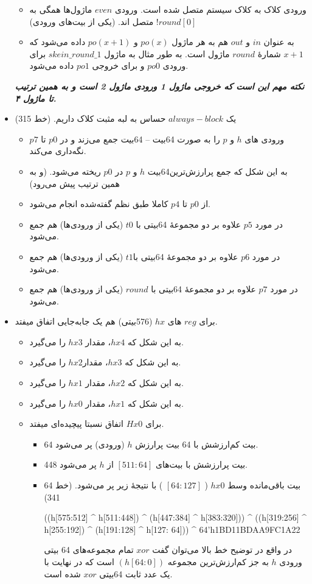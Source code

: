 \begin{itemize}
 \begin{itemize}
 \item ورودی کلاک به کلاک سیستم متصل شده است.
ورودی $ even$ ماژول‌ها همگی به  $!round[0]$ متصل اند. (یکی از بیت‌های ورودی)
\item
به عنوان $in$ و $ out $ هم به هر ماژول $po(x)$ و $po(x+1)$ داده می‌شود که $x+1$ شمارهٔ $ round$ ماژول است. به طور مثال به ماژول $skein\_round\_1$ برای ورودی $po0$ و برای خروجی $po1$ داده می‌شود.
 \end{itemize}
\textit{\textbf{ نکته مهم این است که خروجی ماژول 1 ورودی ماژول 2 است و به همین ترتیب تا ماژول ۴.
}}
\item
یک $always-block$ حساس به لبه مثبت کلاک داریم. (خط 315)
\begin{itemize}
\item
ورودی های $h $ و $p $ را به صورت 64بیت – 64بیت جمع می‌زند و در $p0$ تا $p7$ نگه‌داری می‌کند.
\item
به این شکل که جمع پرارزش‌ترین64بیت $h$ و $p$ در $p0$ ریخته می‌شود. (و به همین ترتیب پیش می‌رود)
\item
از $p0$ تا $p4$ کاملا طبق نظم گفته‌شده انجام می‌شود.
\item
در مورد $p5$ علاوه بر دو مجموعهٔ 64بیتی با $t0$ (یکی از ورودی‌ها) هم جمع می‌شود.
\item
در مورد $ p6$ علاوه بر دو مجموعهٔ 64بیتی با$ t1$ (یکی از ورودی‌ها) هم جمع می‌شود.
\item
در مورد $ p7 $ علاوه بر دو مجموعهٔ 64بیتی با $round$ (یکی از ورودی‌ها) هم جمع می‌شود.
\end{itemize}
\item
برای $reg$ های $hx$ (576بیتی) هم یک جابه‌جایی اتفاق میفتد.
\begin{itemize}
\item
به این شکل که $hx4$، مقدار $hx3$ را می‌گیرد.
\item
به این شکل که $hx3$، مقدار$ hx2$ را می‌گیرد.
\item
به این شکل که $hx2$، مقدار $hx1$ را می‌گیرد.
\item
به این شکل که $hx1$، مقدار $hx0$ را می‌گیرد.
\item
برای $Hx0$ اتفاق نسبتا پیچیده‌ای میفتد.
\begin{itemize}
\item
64 بیت کم‌ارزشش با 64 بیت پرارزش $h$ (ورودی) پر می‌شود.
\item
448 بیت پرارزشش  با بیت‌های $[511:64]$ از $h$ پر می‌شود.
\item
64 بیت باقی‌مانده وسط $hx0$ ( $[64:127]$ ) با نتیجهٔ زیر پر می‌شود.  (خط 341)
\begin{code}
((h[575:512] ^ h[511:448]) ^ (h[447:384] ^ h[383:320])) ^ ((h[319:256] ^ h[255:192]) ^  (h[191:128] ^ h[127: 64])) ^ 64'h1BD11BDAA9FC1A22
\end{code}

در واقع در توضیح خط بالا می‌توان گفت $xor$ تمام مجموعه‌های 64 بیتی ورودی $h$ به جز کم‌ارزش‌ترین مجموعه $(h[64:0])$ است که در نهایت با یک عدد ثابت 64بیتی $xor$ شده است.

\end{itemize}
\end{itemize}
\end{itemize}

